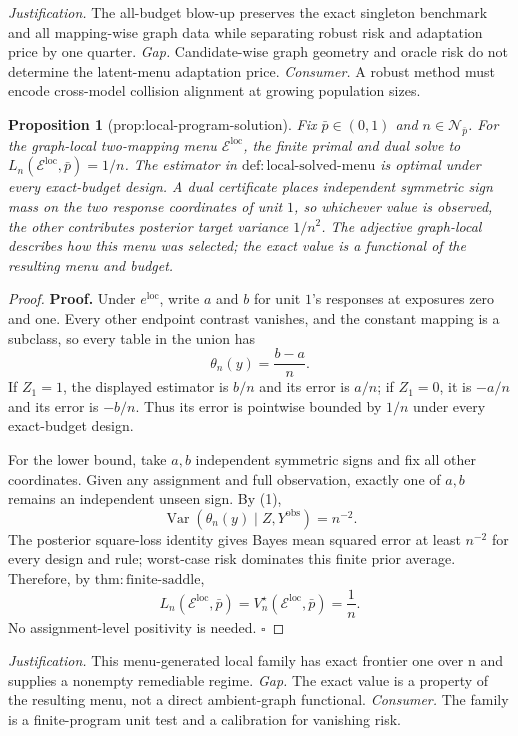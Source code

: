\documentclass{article}
\newtheorem{proposition}{Proposition}
\begin{document}
\par\smallskip\noindent \textit{Justification.} The all-budget blow-up preserves the exact singleton benchmark and all mapping-wise graph data while separating robust risk and adaptation price by one quarter. \textit{Gap.} Candidate-wise graph geometry and oracle risk do not determine the latent-menu adaptation price. \textit{Consumer.} A robust method must encode cross-model collision alignment at growing population sizes.

\begin{proposition}[prop:local-program-solution]\label{prop:local-program-solution}
Fix \(\bar p\in(0,1)\) and \(n\in\mathcal N_{\bar p}\). For the graph-local two-mapping menu \(\mathcal E^{\mathrm{loc}}\), the finite primal and dual solve to \(L_n(\mathcal E^{\mathrm{loc}},\bar p)=1/n\). The estimator in \(\mathrm{def{:}local\text{-}solved\text{-}menu}\) is optimal under every exact-budget design. A dual certificate places independent symmetric sign mass on the two response coordinates of unit \(1\), so whichever value is observed, the other contributes posterior target variance \(1/n^2\). The adjective graph-local describes how this menu was selected; the exact value is a functional of the resulting menu and budget.
\end{proposition}
\begin{proof}
\textbf{Proof.}
Under \(e^{\mathrm{loc}}\), write \(a\) and \(b\) for unit \(1\)'s responses at exposures zero and one. Every other endpoint contrast vanishes, and the constant mapping is a subclass, so every table in the union has
\[
 \theta_n(y)=\frac{b-a}{n}. \tag{1}
\]
If \(Z_1=1\), the displayed estimator is \(b/n\) and its error is \(a/n\); if \(Z_1=0\), it is \(-a/n\) and its error is \(-b/n\). Thus its error is pointwise bounded by \(1/n\) under every exact-budget design.

For the lower bound, take \(a,b\) independent symmetric signs and fix all other coordinates. Given any assignment and full observation, exactly one of \(a,b\) remains an independent unseen sign. By (1),
\[
 \operatorname{Var}(\theta_n(y)\mid Z,Y^{\mathrm{obs}})=n^{-2}.
\]
The posterior square-loss identity gives Bayes mean squared error at least \(n^{-2}\) for every design and rule; worst-case risk dominates this finite prior average. Therefore, by \(\mathrm{thm{:}finite\text{-}saddle}\),
\[
 L_n(\mathcal E^{\mathrm{loc}},\bar p)
 =V_n^\star(\mathcal E^{\mathrm{loc}},\bar p)=\frac1n.
\]
No assignment-level positivity is needed. \(\square\)
\end{proof}
\par\smallskip\noindent \textit{Justification.} This menu-generated local family has exact frontier one over n and supplies a nonempty remediable regime. \textit{Gap.} The exact value is a property of the resulting menu, not a direct ambient-graph functional. \textit{Consumer.} The family is a finite-program unit test and a calibration for vanishing risk.
\end{document}
